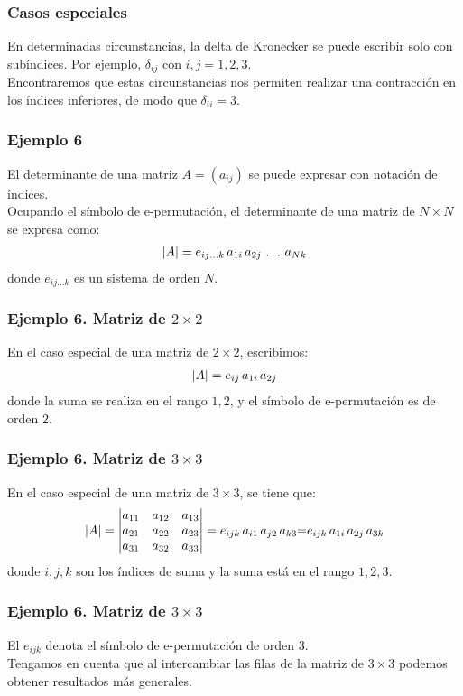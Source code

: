 \documentclass[12pt]{beamer}
\begin{document}
\begin{frame}
\frametitle{Casos especiales}
En determinadas circunstancias, la delta de Kronecker se puede escribir solo con subíndices. Por ejemplo, $\delta_{ij}$ con $i, j = 1, 2, 3$.
\\
\bigskip
Encontraremos que estas circunstancias nos permiten realizar una contracción en los índices inferiores, de modo que $\delta_{ii} = 3$.
\end{frame}
\begin{frame}
\frametitle{Ejemplo 6}
El determinante de una matriz $A = (a_{ij})$ se puede expresar con notación de índices.
\\
\bigskip
\pause
Ocupando el símbolo de e-permutación, el determinante de una matriz de $N \times N$ se expresa como:
\begin{align*}
\abs{A} = e_{ij \ldots k} \, a_{1i} \, a_{2j} \, \ldots \, a_{Nk} 
\end{align*}
donde $e_{ij \ldots k}$ es un sistema de orden $N$.
\end{frame}
\begin{frame}
\frametitle{Ejemplo 6. Matriz de $2 \times 2$}
En el caso especial de una matriz de $2 \times 2$, escribimos:
\begin{align*}
\abs{A} = e_{ij} \, a_{1i} \, a_{2j}
\end{align*}
donde la suma se realiza en el rango $1, 2$, y el símbolo de e-permutación es de orden $2$.
\end{frame}
\begin{frame}
\frametitle{Ejemplo 6. Matriz de $3 \times 3$}
{\fontsize{12}{12}\selectfont En el caso especial de una matriz de $3 \times 3$, se tiene que:}
\begin{align*}
\abs{A} = \mqty|
a_{11} & a_{12} & a_{13} \\
a_{21} & a_{22} & a_{23} \\
a_{31} & a_{32} & a_{33}
| = e_{ijk} \, a_{i1} \, a_{j2} \, a_{k3} {=} e_{ijk} \, a_{1i} \, a_{2j} \, a_{3k}
\end{align*}
{\fontsize{12}{12}\selectfont
donde $i, j, k$ son los índices de suma y la suma está en el rango $1, 2, 3$.}
\end{frame}
\begin{frame}
\frametitle{Ejemplo 6. Matriz de $3 \times 3$}
El $e_{ijk}$ denota el símbolo de e-permutación de orden $3$.
\\
\bigskip
\pause
Tengamos en cuenta que al intercambiar las filas de la matriz de $3 \times 3$ podemos obtener resultados más generales.
\end{frame}
\end{document}
